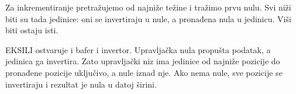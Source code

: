 Za inkrementiranje pretražujemo od najniže težine i tražimo prvu nulu. Svi niži biti su tada jedinice: oni se invertiraju u nule, a pronađena nula u jedinicu. Viši biti ostaju isti.

EKSILI ostvaruje i bafer i invertor. Upravljačka nula propušta podatak, a jedinica ga invertira. Zato upravljački niz ima jedinice od najniže pozicije do pronađene pozicije uključivo, a nule iznad nje. Ako nema nule, sve pozicije se invertiraju i rezultat je nula u datoj širini.
